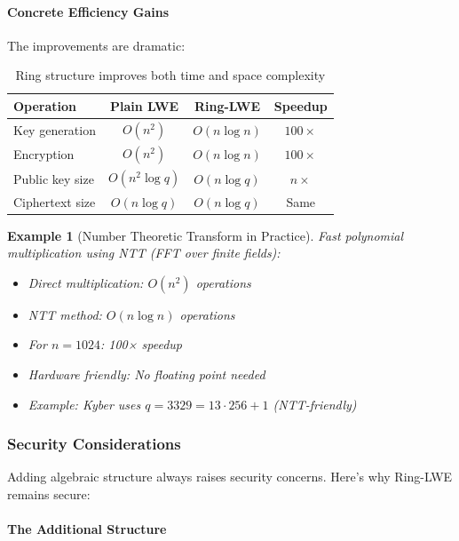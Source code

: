 \documentclass[11pt,a4paper]{article}
\newtheorem{example}{Example}
\begin{document}
\paragraph{Concrete Efficiency Gains}

The improvements are dramatic:

\begin{table}[h]
\centering
\begin{tabular}{|l|c|c|c|}
\hline
\textbf{Operation} & \textbf{Plain LWE} & \textbf{Ring-LWE} & \textbf{Speedup} \\
\hline
Key generation & $O(n^2)$ & $O(n \log n)$ & $100\times$ \\
Encryption & $O(n^2)$ & $O(n \log n)$ & $100\times$ \\
Public key size & $O(n^2 \log q)$ & $O(n \log q)$ & $n\times$ \\
Ciphertext size & $O(n \log q)$ & $O(n \log q)$ & Same \\
\hline
\end{tabular}
\caption{Ring structure improves both time and space complexity}
\end{table}

\begin{example}[Number Theoretic Transform in Practice]
Fast polynomial multiplication using NTT (FFT over finite fields):
\begin{itemize}
    \item Direct multiplication: $O(n^2)$ operations
    \item NTT method: $O(n \log n)$ operations
    \item For $n = 1024$: 100× speedup
    \item Hardware friendly: No floating point needed
    \item Example: Kyber uses $q = 3329 = 13 \cdot 256 + 1$ (NTT-friendly)
\end{itemize}
\end{example}

\subsubsection{Security Considerations}

Adding algebraic structure always raises security concerns. Here's why Ring-LWE remains secure:

\paragraph{The Additional Structure}
\end{document}
